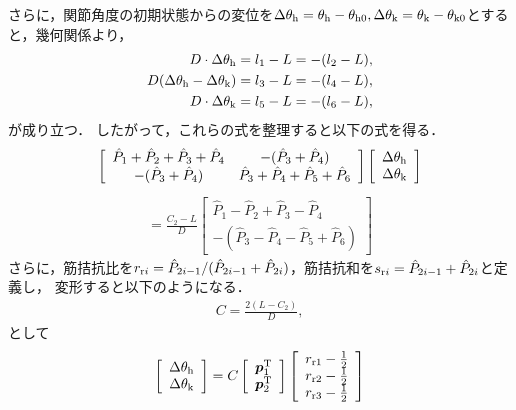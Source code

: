 さらに，関節角度の初期状態からの変位を$\Delta\theta_{\rm h}=\theta_{\rm h}-\theta_{{\rm h}0},\Delta\theta_{\rm k}=\theta_{\rm k}-\theta_{{\rm k}0}$とすると，幾何関係より，
\begin{eqnarray}
 \label{geo1}
 D\cdot\Delta\theta_{\rm h}=l_1-L=-(l_2-L),\\
 \label{geo2}
 D(\Delta\theta_{\rm h}-\Delta\theta_{\rm k})=l_3-L=-(l_4-L),\\
 \label{geo3}
 D\cdot\Delta\theta_{\rm k}=l_5-L=-(l_6-L),
\end{eqnarray}
が成り立つ．
したがって，これらの式を整理すると以下の式を得る．
\begin{eqnarray*}
 \label{mat1}
 \left[
  \begin{array}{cc}
   \hat{P}_1+\hat{P}_2+\hat{P}_3+\hat{P}_4 & -(\hat{P}_3+\hat{P}_4) \\
   -(\hat{P}_3+\hat{P}_4) & \hat{P}_3+\hat{P}_4+\hat{P}_5+\hat{P}_6
  \end{array}
 \right]
 \left[
  \begin{array}{c}
   \Delta\theta_{\rm h} \\
   \Delta\theta_{\rm k}
  \end{array}
 \right]
\end{eqnarray*}
\vspace{-1.em}
\begin{eqnarray}
 \label{mat2}
 =\frac{C_2-L}{D}
 \left[
  \begin{array}{c}
   \hat{P}_1-\hat{P}_2+\hat{P}_3-\hat{P}_4 \\
   -(\hat{P}_3-\hat{P}_4-\hat{P}_5+\hat{P}_6)
  \end{array}
 \right]
\end{eqnarray}
さらに，筋拮抗比を$r_{{\rm r}i}=\hat{P}_{2i-1}/(\hat{P}_{2i-1}+\hat{P}_{2i})$，筋拮抗和を$s_{{\rm r}i}=\hat{P}_{2i-1}+\hat{P}_{2i}$と定義し，%
変形すると以下のようになる．
\begin{eqnarray}
 C=\frac{2(L-C_2)}{D},
\end{eqnarray}
として
\begin{eqnarray}
 \label{mat3}
 \left[
  \begin{array}{c}
   \Delta\theta_{\rm h} \\
   \Delta\theta_{\rm k}
  \end{array}
 \right]=C
 \left[
  \begin{array}{c}
   \mbox{\boldmath{$p$}}^{\rm T}_1 \\
   \mbox{\boldmath{$p$}}^{\rm T}_2
  \end{array}
 \right]
 \left[
  \begin{array}{c}
   r_{{\rm r}1}-\frac{1}{2} \\
   r_{{\rm r}2}-\frac{1}{2} \\
   r_{{\rm r}3}-\frac{1}{2} \\
  \end{array}
 \right]
\end{eqnarray}


